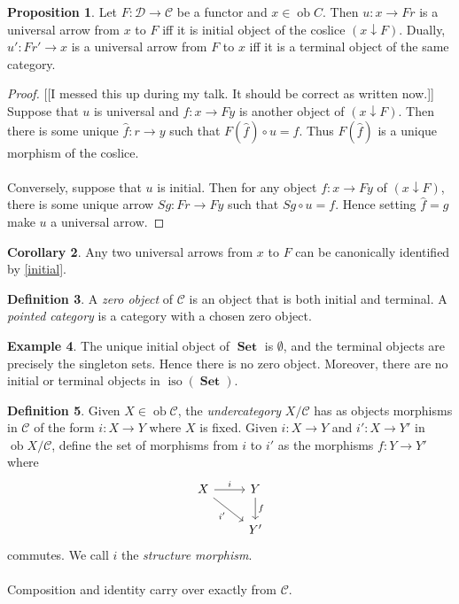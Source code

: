 \documentclass[10pt,letterpaper,cm]{nupset}
\theoremstyle{definition}
\newtheorem{definition}{Definition}
\newtheorem{exmp}[definition]{Example}
\theoremstyle{theorem}
\newtheorem{prop}[definition]{Proposition}
\newtheorem{corollary}[definition]{Corollary}
\theoremstyle{remark}
\newcommand{\1}{\mathbf{1}}
\renewcommand{\c}{\mathscr{C}}
\renewcommand{\d}{\mathscr{D}}
\newcommand{\0}{\vec 0}
\DeclareMathOperator{\ob}{ob}
\DeclareMathOperator{\iso}{iso}
\DeclareMathOperator{\set}{\mathbf{Set}}
\begin{document}
\begin{prop}
Let $F : \d \to \c$ be a functor and $x \in \ob C$. Then $u : x \to Fr$ is a universal arrow from $x$ to $F$ iff it is initial object of the coslice $(x \downarrow F)$. Dually, $u' : Fr' \to x$ is a universal arrow from $F$ to $x$  iff it is a terminal object of the same category.
\end{prop}
\begin{proof}{[[I messed this up during my talk. It should be correct as written now.]]}
Suppose that $u$ is universal and $f: x \to Fy$ is another object of $(x \downarrow F)$. Then there is some unique $\hat{f}: r \to y$ such that $F(\hat{f}) \circ u = f$. Thus $F(\hat{f})$ is a unique morphism of the coslice.
\\ \\Conversely, suppose that $u$ is initial. Then for any object $f: x \to Fy$ of $(x \downarrow F)$, there is some unique arrow $Sg : Fr \to Fy$ such that $Sg \circ u = f$. Hence setting $\hat{f} = g$ make $u$ a universal arrow.
\end{proof}

\begin{corollary}
Any two universal arrows from $x$ to $F$ can be canonically identified by \cref{initial}.
\end{corollary}

\begin{definition}
A \textit{zero object} of $\c$ is an object that is both initial and terminal. A \textit{pointed category} is a category with a chosen zero object. 
\end{definition}

\begin{exmp}
The unique initial object of $\set$ is $\emptyset$, and the terminal objects are precisely the singleton sets. Hence there is no zero object. Moreover, there are no initial or terminal objects in $\iso(\set)$.
\end{exmp}

\begin{definition}
Given $X \in \ob \c$, the \textit{undercategory} ${X}/{\c}$ has as objects morphisms in $\c$ of the form $i : X \to Y$ where $X$ is fixed. Given $i: X \to Y$ and  $i' : X \to Y'$ in $\ob {X}/{\c}$, define the set of morphisms from $i$ to $i'$ as the morphisms $f: Y \to Y'$ where
\[ \begin{tikzcd}
X \arrow[r, "i"] \arrow[swap, dr,  " i' "] & Y \arrow[d, "f"] \\%
 & Y'
\end{tikzcd}
\]
commutes. We call $i$ the \textit{structure morphism}.
\\ \\ Composition and identity carry over exactly from $\c$.
\end{definition}
\end{document}
